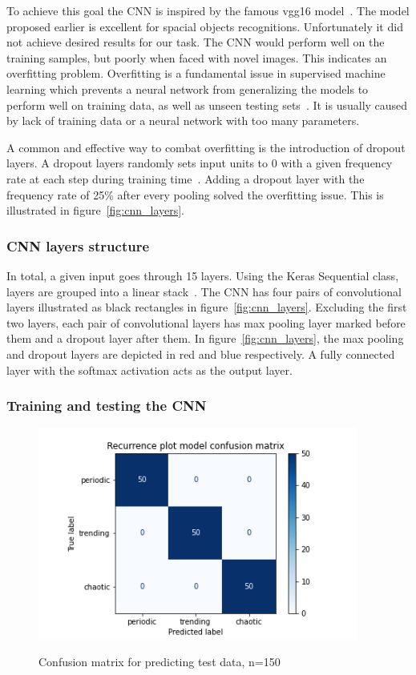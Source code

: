 \documentclass[a4paper,12pt,fleqn]{article}
\begin{document}
To achieve this goal the CNN is inspired by the famous vgg16 model~\cite{brusilovsky:simonyan2014very}.
The model proposed earlier is excellent for spacial objects recognitions.
Unfortunately it did not achieve desired results for our task.
The CNN would perform well on the training samples, but poorly when faced with novel images.
This indicates an overfitting problem.
Overfitting is a fundamental issue in supervised machine learning which prevents a neural network from generalizing the models to perform well on training data, as well as unseen testing sets~\cite{overfitting}.
It is usually caused by lack of training data or a neural network with too many parameters.

A common and effective way to combat overfitting is the introduction of dropout layers.
A dropout layers randomly sets input units to 0 with a given frequency rate at each step during training time~\cite{dropout}.
Adding a dropout layer with the frequency rate of 25\% after every pooling solved the overfitting issue.
This is illustrated in figure~\ref{fig:cnn_layers}.


\subsubsection{CNN layers structure}
In total, a given input goes through 15 layers.
Using the Keras Sequential class, layers are grouped into a linear stack~\cite{sequential}.
The CNN has four pairs of convolutional layers illustrated as black rectangles in figure~\ref{fig:cnn_layers}.
Excluding the first two layers, each pair of convolutional layers has max pooling layer marked before them and a dropout layer after them.
In figure~\ref{fig:cnn_layers}, the max pooling and dropout layers are depicted in red and blue respectively.
A fully connected layer with the softmax activation acts as the output layer.


\subsubsection{Training and testing the CNN}

\begin{figure}[h]
  \centering
  {\includegraphics[height=7cm]{assets/confusion_matrix.png}}
  \caption{Confusion matrix for predicting test data, n=150}
  \label{fig:confusion_matrix}
\end{figure}
\end{document}
